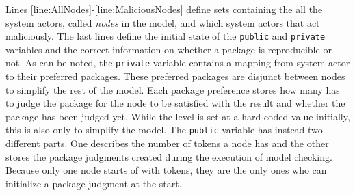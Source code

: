 Lines \ref{line:AllNodes}-\ref{line:MaliciousNodes} define sets containing the all the system actors, called \textit{nodes} in the model, and which system actors that act maliciously. The last lines define the initial state of the \texttt{public} and \texttt{private} variables and the correct information on whether a package is reproducible or not. As can be noted, the \texttt{private} variable contains a mapping from system actor to their preferred packages. These preferred packages are disjunct between nodes to simplify the rest of the model. Each package preference stores how many has to judge the package for the node to be satisfied with the result and whether the package has been judged yet. While the level is set at a hard coded value initially, this is also only to simplify the model. The \texttt{public} variable has instead two different parts. One describes the number of tokens a node has and the other stores the package judgments created during the execution of model checking. Because only one node starts of with tokens, they are the only ones who can initialize a package judgment at the start.

